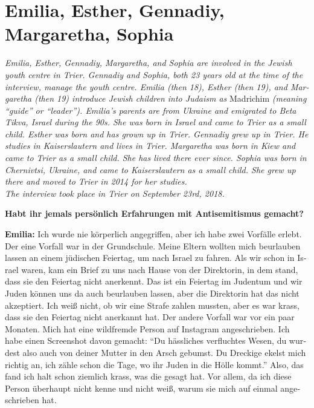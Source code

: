 \section{Emilia, Esther, Gennadiy, Margaretha, Sophia}
\begin{otherlanguage}{ngerman}
\textit{Emilia, Esther, Gennadiy, Margaretha, and Sophia are involved in the Jewish youth centre in Trier. Gennadiy and Sophia, both 23 years old at the time of the interview, manage the youth centre. Emilia (then 18), Esther (then 19), and Margaretha (then 19) introduce Jewish children into Judaism as} Madrichim \textit{(meaning ``guide'' or ``leader''). Emilia’s parents are from Ukraine and emigrated to Beta Tikva, Israel during the 90s. She was born in Israel and came to Trier as a small child. Esther was born and has grown up in Trier. Gennadiy grew up in Trier. He studies in Kaiserslautern and lives in Trier. Margaretha was born in Kiew and came to Trier as a small child. She has lived there ever since. Sophia was born in Chernivtsi, Ukraine, and came to Kaiserslautern as a small child. She grew up there and moved to Trier in 2014 for her studies.\\
The interview took place in Trier on September 23rd, 2018.}\par   
\vspace*{2em}
\textbf{Habt ihr jemals persönlich Erfahrungen mit Antisemitismus gemacht?} 

\textbf{Emilia:} Ich wurde nie körperlich angegriffen, aber ich habe zwei Vorfälle erlebt. Der eine Vorfall war in der Grundschule. Meine Eltern wollten mich beurlauben lassen an einem jüdischen Feiertag, um nach Israel zu fahren. Als wir schon in Israel waren, kam ein Brief zu uns nach Hause von der Direktorin, in dem stand, dass sie den Feiertag nicht anerkennt. Das ist ein Feiertag im Judentum und wir Juden können uns da auch beurlauben lassen, aber die Direktorin hat das nicht akzeptiert. Ich weiß nicht, ob wir eine Strafe zahlen mussten, aber es war krass, dass sie den Feiertag nicht anerkannt hat. Der andere Vorfall war vor ein paar Monaten. Mich hat eine wildfremde Person auf Instagram angeschrieben. Ich habe einen Screenshot davon gemacht: "`Du hässliches verfluchtes Wesen, du wurdest also auch von deiner Mutter in den Arsch gebumst. Du Dreckige ekelst mich richtig an, ich zähle schon die Tage, wo ihr Juden in die Hölle kommt."' Also, das fand ich halt schon ziemlich krass, was die gesagt hat.  Vor allem, da ich diese Person überhaupt nicht kenne und nicht weiß, warum sie mich auf einmal angeschrieben hat. 


\end{otherlanguage}
